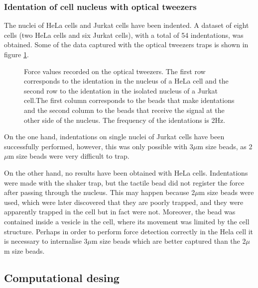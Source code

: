 \documentclass[12pt, a4paper]{article} %
\begin{document}
\setlength{\parskip}{0mm}

\subsubsection{Identation of cell nucleus with optical tweezers}

The nuclei of HeLa cells and Jurkat cells have been indented. A dataset of eight cells (two HeLa cells and six Jurkat cells), with a total of 54 indentations, was obtained. Some of the data captured with the optical tweezers traps is shown in figure \ref{fig:raw_data_cells}.

\setlength{\parskip}{4mm}

\begin{figure}[htbp]
	\centering
	
	\caption{Force values recorded on the optical tweezers. The first row corresponds to the identation in the nucleus of a HeLa cell and the second row to the identation in the isolated nucleus of a Jurkat cell.The first column corresponds to the beads that make identations and the second column to the beads that receive the signal at the other side of the nucleus. The frequency of the identations is 2Hz.}
	\label{fig:raw_data_cells}
\end{figure}
On the one hand, indentations on single nuclei of Jurkat cells have been successfully performed, however, this was only possible with 3$\mu$m size beads, as 2$\mu$m size beads were very difficult to trap. 

On the other hand, no results have been obtained with HeLa cells. Indentations were made with the shaker trap, but the tactile bead did not register the force after passing through the nucleus. This may happen because 2$\mu$m size beads were used, which were later discovered that they are poorly trapped, and they were apparently trapped in the cell but in fact were not. Moreover, the bead was contained inside a vesicle in the cell, where its movement was limited by the cell structure. Perhaps in order to perform force detection correctly in the Hela cell it is necessary to internalise 3$\mu$m size beads which are better captured than the 2$\mu$m size beads.
\setlength{\parskip}{0mm}

\subsection{Computational desing}
\end{document}
